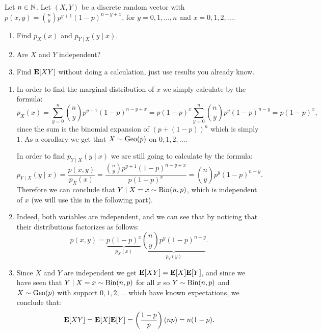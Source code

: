 \documentclass[11pt,a4paper]{article}
\begin{document}
\begin{exercise}
  Let $n \in \mathbb{N}$.
  Let $(X,Y)$ be a discrete random vector
  with $p(x,y) = \binom{n}{y} p^{y+1} (1 - p)^{n - y + x}$,
  for $y = 0,1,\dots,n$ and $x = 0,1,2,\dots$.
  \begin{enumerate}
    \item[(1)] Find $p_X(x)$ and $p_{Y \mid X}(y \mid x)$.
    \item[(2)] Are $X$ and $Y$ independent?
    \item[(3)] Find $\mathbf{E}[XY]$ without doing a calculation,
      just use results you already know.
  \end{enumerate}
\end{exercise}
\begin{solution} \phantom{}
  \begin{enumerate}
    \item[(1)] In order to find the marginal distribution of $x$ we simply 
      calculate by the formula:
      \[
        p_X(x) =
        \sum_{y=0}^{n} \binom{n}{y} p^{y+1} (1-p)^{n-y+x} =
        p (1-p)^x \sum_{y=0}^{n} \binom{n}{y} p^{y} (1-p)^{n-y} =
        p (1-p)^x,
      \]
      since the sum is the binomial expansion of $(p + (1 - p))^n$ which
      is simply $1$.  
      As a corollary we get that $X \sim \operatorname{Geo}(p)$ on $0,1,2,\dots$.

      In order to find $p_{Y \mid X}(y \mid x)$ we are still going
      to calculate by the formula:
      \[
        p_{Y \mid X}(y \mid x) =
        \frac{p(x,y)}{p_X(x)} =
        \frac{\binom{n}{y} p^{y+1} (1 - p)^{n - y + x}}{p (1-p)^x} =
        \binom{n}{y} p^y (1 - p)^{n - y}.
      \]
      Therefore we can conclude that $Y \mid X = x \sim \operatorname{Bin}(n,p)$,
      which is independent of $x$ (we will use this in the following part).
    \item[(2)] Indeed, both variables are independent,
      and we can see that by noticing that their distributions factorizes
      as follows:
      \[
        p(x,y) =
        \underbrace{p (1 - p)^x}_{p_X(x)}
        \underbrace{\binom{n}{y} p^y (1 - p)^{n - y}}_{p_Y(y)}.
      \]
    \item[(3)] Since $X$ and $Y$ are independent we get
      $\mathbf{E}[XY] = \mathbf{E}[X]\mathbf{E}[Y]$, and since we have seen that
      $Y \mid X = x \sim \operatorname{Bin}(n,p)$ for all $x$ so 
      $Y \sim \operatorname{Bin}(n,p)$ and $X \sim \operatorname{Geo}(p)$ with support $0,1,2,\dots$
      which have known expectations, we conclude that:
      \[
        \E[XY] =
        \E[X] \E[Y] =
        \del{\frac{1-p}{p}} \del{np} =
        n (1 - p).
      \]
  \end{enumerate}
\end{solution}
\end{document}
